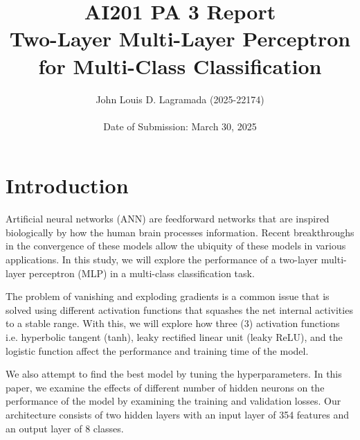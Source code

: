 \documentclass{acm_proc_article-sp}
\begin{document}
\title{AI201 PA 3 Report\\ Two-Layer Multi-Layer Perceptron for Multi-Class Classification}

\author{
\alignauthor John Louis D. Lagramada (2025-22174)\\ %
~\\
Date of Submission: March 30, 2025
}
\makeatletter
{}
\makeatother

\maketitle


\section{Introduction}
Artificial neural networks (ANN) are feedforward networks that are inspired biologically by how the human brain processes information. Recent breakthroughs in the convergence of these models allow the ubiquity of these models in various applications. In this study, we will explore the performance of a two-layer multi-layer perceptron (MLP) in a multi-class classification task.

The problem of vanishing and exploding gradients is a common issue that is solved using different activation functions that squashes the net internal activities to a stable range. With this, we will explore how three (3) activation functions i.e. hyperbolic tangent (tanh), leaky rectified linear unit (leaky ReLU), and the logistic function affect the performance and training time of the model. 

We also attempt to find the best model by tuning the hyperparameters. In this paper, we examine the effects of different number of hidden neurons on the performance of the model by examining the training and validation losses.  Our architecture consists of two hidden layers with an input layer of 354 features and an output layer of 8 classes.
\end{document}
